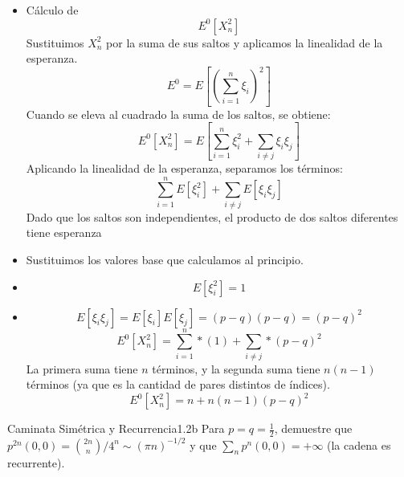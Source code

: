 \documentclass[10pt,a4paper]{article}
\begin{document}
\vspace{5mm}

\begin{itemize}
    \item Cálculo de \[ E^{0}[X_{n}^{2}] \] Sustituimos $X_{n}^{2}$ por la suma de sus saltos y aplicamos la linealidad de la esperanza.
    \[ E^{0}= E\left[ \left( \sum_{i=1}^{n} \xi_i \right)^{2} \right]  \]
     Cuando se eleva al cuadrado la suma de los saltos, se obtiene:
    \[ E^{0}[X_{n}^{2}] = E\left[ \sum_{i=1}^{n} \xi_i^2 +  \sum_{ i \neq j } \xi_i \xi_j \right]  \]
    Aplicando la linealidad de la esperanza, separamos los términos:
    \[ \sum_{i=1}^{n} E[\xi_i^2] + \sum_{i \neq j} E[\xi_i \xi_j] \]
    Dado que los saltos son independientes, el producto de dos saltos diferentes tiene esperanza
    \item Sustituimos los valores base que calculamos al principio.
    \item \[ E[\xi_{i}^{2}] = 1\]
    \item \[ E[\xi_i \xi_j] = E[\xi_i] E[\xi_j] = (p - q)(p - q) = (p - q)^2 \]
    \[E^{0}\left[ X^{2}_{n} \right] = \sum_{i=1}^{n} * (1) + \sum_{i \neq j} * (p-q)^{2} \]
    La primera suma tiene $n$ términos, y la segunda suma tiene $n(n-1)$ términos (ya que es la cantidad de pares distintos de índices).
    \[ E^{0}[X_{n}^{2}] = n + n(n-1)(p-q)^{2} \]

\end{itemize}

\newpage

\begin{ejercicio}{Caminata Simétrica y Recurrencia}{1.2b}
    Para $p = q = \frac{1}{2}$, demuestre que $p^{2n}(0,0) = \binom{2n}{n}/4^n \sim (\pi n)^{-1/2}$ y que $\sum_n p^n(0,0) = +\infty$ (la cadena es recurrente).
\end{ejercicio}
\end{document}
